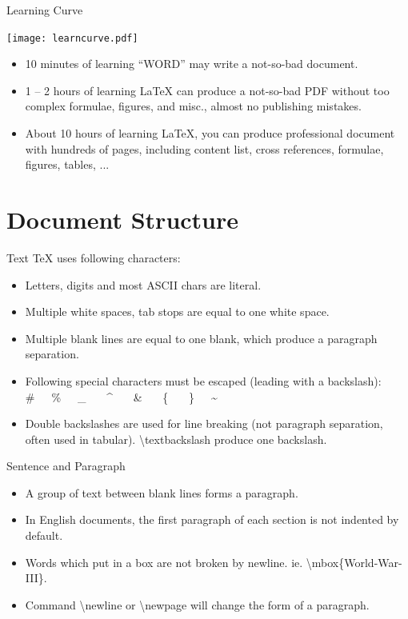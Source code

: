 \documentclass[10pt]{beamer}
\begin{document}
\begin{frame}{Learning Curve}
\begin{center}
    \texttt{[image: learncurve.pdf]}
\end{center}

\begin{itemize}
    \item 10 minutes of learning ``WORD'' may write a not-so-bad document.
    \item 1 -- 2 hours of learning \LaTeX{} can produce a not-so-bad
        PDF without too complex formulae, figures, and misc., almost
        no publishing mistakes.
    \item About 10 hours of learning \LaTeX{}, you can produce
        professional document with hundreds
        of pages, including content list, cross references,
        formulae, figures, tables, ...
\end{itemize}
\end{frame}

\section{Document Structure}
\begin{frame}{Text}
    \TeX{} uses following characters:
\begin{itemize}
    \item Letters, digits and most ASCII chars are literal.
    \item Multiple white spaces, tab stops are equal to one white space.
    \item Multiple blank lines are equal to one blank, which produce
        a paragraph separation.
    \item Following special characters must be escaped (leading with a backslash):\\
        \#\ \ \ \%\ \ \ \_ \ \ \ \^{} \ \ \ \& \ \ \ \{ \ \ \ \}\ \ \ \~{}
    \item Double backslashes are used for line breaking
        (not paragraph separation, often used in tabular).
        \alert{\textbackslash textbackslash} produce one backslash.
\end{itemize}
\end{frame}

\begin{frame}{Sentence and Paragraph}
\begin{itemize}
    \item A group of text between blank lines forms a paragraph.
    \item In English documents, the first paragraph of each section
        is not indented by default.
    \item Words which put in a box are not broken by newline. ie.
        \textbackslash mbox\{World-War-III\}.
    \item Command \alert{\textbackslash newline} or
        \alert{\textbackslash newpage} will change the form of a paragraph.
\end{itemize}
\end{frame}
\end{document}
